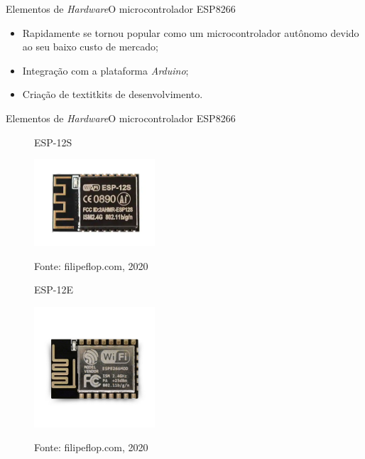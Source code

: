 \begin{frame}{Elementos de \textit{Hardware}}{O microcontrolador ESP8266}
    \begin{itemize}
        \item Rapidamente se tornou popular como um microcontrolador autônomo devido ao seu baixo custo de mercado;
        \item Integração com a plataforma \textit{Arduino};
        \item Criação de textit{kits} de desenvolvimento.
    \end{itemize}

\end{frame}

\begin{frame}{Elementos de \textit{Hardware}}{O microcontrolador ESP8266}
    \vspace*{-0.4cm}
    \begin{figure}[!ht]
        \centering
        \hspace*{0.1cm}
        \begin{minipage}{0.5\linewidth}
            \centering
            \caption{ESP-12S}
            \includegraphics[width=0.4\textwidth]{figuras/ESP-12S.png}
            \label{fig:esp12s}
            \caption*{\tiny{Fonte: filipeflop.com, 2020}}
        \end{minipage}\hfill
        \begin{minipage}{0.5\linewidth}
            \centering
            \caption{ESP-12E}
            \hspace*{0.5cm}
            \includegraphics[width=0.4\textwidth]{figuras/ESP-12E.png}
            \label{fig:esp12e}
            \vspace*{-0.5cm}
            \caption*{\tiny{Fonte: filipeflop.com, 2020}}
        \end{minipage}
    \end{figure}

\end{frame}

